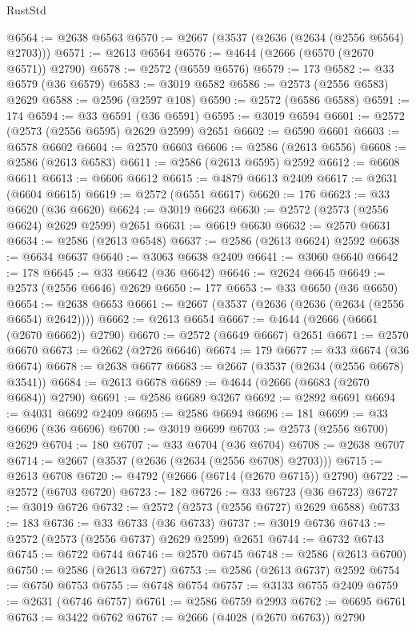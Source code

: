 \begin{lexlean}{RustStd}
\begin{coremodule}
@6564 := @2638 @6563
@6570 := @2667 (@3537 (@2636 (@2634 (@2556 @6564) @2703)))
@6571 := @2613 @6564
@6576 := @4644 (@2666 (@6570 (@2670 @6571)) @2790)
@6578 := @2572 (@6559 @6576)
@6579 := 173
@6582 := @33 @6579 (@36 @6579)
@6583 := @3019 @6582
@6586 := @2573 (@2556 @6583) @2629
@6588 := @2596 (@2597 @108)
@6590 := @2572 (@6586 @6588)
@6591 := 174
@6594 := @33 @6591 (@36 @6591)
@6595 := @3019 @6594
@6601 := @2572 (@2573 (@2556 @6595) @2629 @2599) @2651
@6602 := @6590 @6601
@6603 := @6578 @6602
@6604 := @2570 @6603
@6606 := @2586 (@2613 @6556)
@6608 := @2586 (@2613 @6583)
@6611 := @2586 (@2613 @6595) @2592
@6612 := @6608 @6611
@6613 := @6606 @6612
@6615 := @4879 @6613 @2409
@6617 := @2631 (@6604 @6615)
@6619 := @2572 (@6551 @6617)
@6620 := 176
@6623 := @33 @6620 (@36 @6620)
@6624 := @3019 @6623
@6630 := @2572 (@2573 (@2556 @6624) @2629 @2599) @2651
@6631 := @6619 @6630
@6632 := @2570 @6631
@6634 := @2586 (@2613 @6548)
@6637 := @2586 (@2613 @6624) @2592
@6638 := @6634 @6637
@6640 := @3063 @6638 @2409
@6641 := @3060 @6640
@6642 := 178
@6645 := @33 @6642 (@36 @6642)
@6646 := @2624 @6645
@6649 := @2573 (@2556 @6646) @2629
@6650 := 177
@6653 := @33 @6650 (@36 @6650)
@6654 := @2638 @6653
@6661 := @2667 (@3537 (@2636 (@2636 (@2634 (@2556 @6654) @2642))))
@6662 := @2613 @6654
@6667 := @4644 (@2666 (@6661 (@2670 @6662)) @2790)
@6670 := @2572 (@6649 @6667) @2651
@6671 := @2570 @6670
@6673 := @2662 (@2726 @6646)
@6674 := 179
@6677 := @33 @6674 (@36 @6674)
@6678 := @2638 @6677
@6683 := @2667 (@3537 (@2634 (@2556 @6678) @3541))
@6684 := @2613 @6678
@6689 := @4644 (@2666 (@6683 (@2670 @6684)) @2790)
@6691 := @2586 @6689 @3267
@6692 := @2892 @6691
@6694 := @4031 @6692 @2409
@6695 := @2586 @6694
@6696 := 181
@6699 := @33 @6696 (@36 @6696)
@6700 := @3019 @6699
@6703 := @2573 (@2556 @6700) @2629
@6704 := 180
@6707 := @33 @6704 (@36 @6704)
@6708 := @2638 @6707
@6714 := @2667 (@3537 (@2636 (@2634 (@2556 @6708) @2703)))
@6715 := @2613 @6708
@6720 := @4792 (@2666 (@6714 (@2670 @6715)) @2790)
@6722 := @2572 (@6703 @6720)
@6723 := 182
@6726 := @33 @6723 (@36 @6723)
@6727 := @3019 @6726
@6732 := @2572 (@2573 (@2556 @6727) @2629 @6588)
@6733 := 183
@6736 := @33 @6733 (@36 @6733)
@6737 := @3019 @6736
@6743 := @2572 (@2573 (@2556 @6737) @2629 @2599) @2651
@6744 := @6732 @6743
@6745 := @6722 @6744
@6746 := @2570 @6745
@6748 := @2586 (@2613 @6700)
@6750 := @2586 (@2613 @6727)
@6753 := @2586 (@2613 @6737) @2592
@6754 := @6750 @6753
@6755 := @6748 @6754
@6757 := @3133 @6755 @2409
@6759 := @2631 (@6746 @6757)
@6761 := @2586 @6759 @2993
@6762 := @6695 @6761
@6763 := @3422 @6762
@6767 := @2666 (@4028 (@2670 @6763)) @2790

\end{coremodule}
\end{lexlean}

